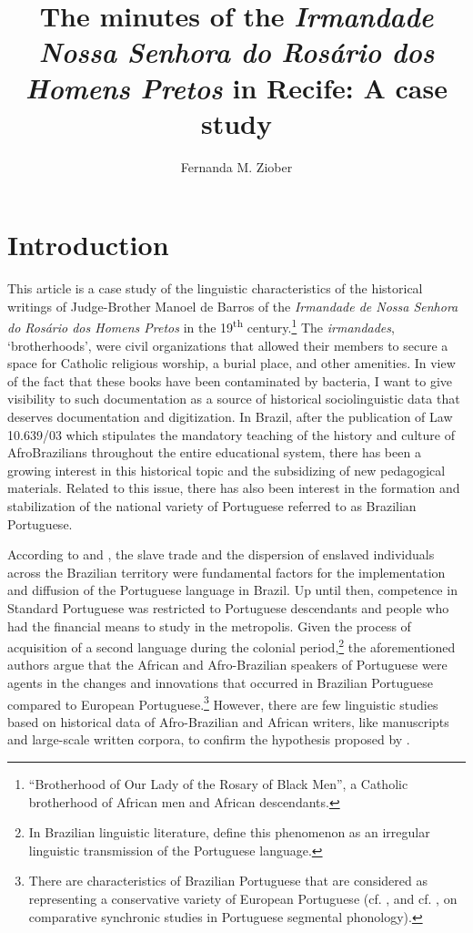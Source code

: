 \documentclass[output=paper,colorlinks,citecolor=brown]{langscibook}
\author{Fernanda M. Ziober\orcid{}\affiliation{Vrije Universiteit Amsterdam}}
\title[The minutes of the \emph{Irmandade Nossa Senhora do Rosário dos Homens Pretos}]
      {The minutes of the \emph{Irmandade Nossa Senhora do Rosário dos Homens Pretos} in Recife: A case study}
\begin{document}
\maketitle


\section{Introduction}

This article is a case study of the linguistic characteristics of the historical writings of Judge-Brother Manoel de Barros of the \emph{Irmandade de Nossa Senhora do Rosário dos Homens Pretos} in the 19\textsuperscript{th} century.\footnote{“Brotherhood of Our Lady of the Rosary of Black Men”, a Catholic brotherhood of African men and African descendants.} The \emph{irmandades}, ‘brotherhoods’, were civil organizations that allowed their members to secure a space for Catholic religious worship, a burial place, and other amenities. In view of the fact that these books have been contaminated by bacteria, I want to give visibility to such documentation as a source of historical sociolinguistic data that deserves documentation and digitization. In Brazil, after the publication of Law 10.639/03 which stipulates the mandatory teaching of the history and culture of AfroBrazilians throughout the entire educational system, there has been a growing interest in this historical topic and the subsidizing of new pedagogical materials. Related to this issue, there has also been interest in the formation and stabilization of the national variety of Portuguese referred to as Brazilian Portuguese.

According to \citet{Mattos_e_Silva_2004} and \citet{Noll_2008}, the slave trade and the dispersion of enslaved individuals across the Brazilian territory were fundamental factors for the implementation and diffusion of the Portuguese language in Brazil. Up until then, competence in Standard Portuguese was restricted to Portuguese descendants and people who had the financial means to study in the metropolis. Given the process of acquisition of a second language during the colonial period,\footnote{In Brazilian linguistic literature, \citet{Lucchesi_Baxter_Ribeiro_2009} define this phenomenon as an irregular linguistic transmission of the Portuguese language.} the aforementioned authors argue that the African and Afro-Brazilian speakers of Portuguese were agents in the changes and innovations that occurred in Brazilian Portuguese compared to European Portuguese.\footnote{There are characteristics of Brazilian Portuguese that are considered as representing a conservative variety of European Portuguese (cf. \cite{Graebin_2017}, and cf. \cite{Massini_Cagliari_Redenbarger_2016}, on comparative synchronic studies in Portuguese segmental phonology).}  However, there are few linguistic studies based on historical data of Afro-Brazilian and African writers, like manuscripts and large-scale written corpora, to confirm the hypothesis proposed by \citet{Mattos_e_Silva_2004}.
\end{document}
